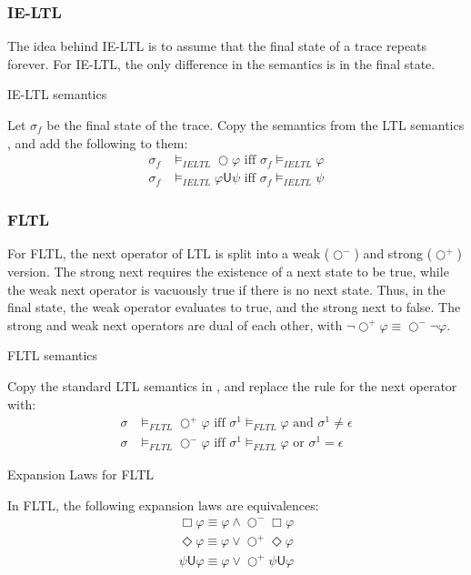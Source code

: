 \documentclass[a4paper]{article}
\newcommand{\U}{\mathsf{U}}
\newcommand{\tand}{\text{ and }}
\newcommand{\tor}{\text{ or }}
\newcommand{\tiff}{\text{ iff }}
\newcommand{\sn}{\bigcirc^+}
\newcommand{\wn}{\bigcirc^-}
\begin{document}
\subsubsection{IE-LTL} The idea behind IE-LTL is to assume that the final state of a trace repeats forever. For IE-LTL, the only difference in the semantics is in the final state.
\begin{defn}{IE-LTL semantics}

  Let $\sigma_f$ be the final state of the trace. Copy the semantics from the LTL semantics , and add the following to them:
  \begin{align*}
    \sigma_f &\vDash_{IELTL} \bigcirc \varphi \tiff \sigma_f \vDash_{IELTL} \varphi\\
    \sigma_f &\vDash_{IELTL} \varphi \U \psi \tiff \sigma_f \vDash_{IELTL} \psi
  \end{align*}
\end{defn}


\subsubsection{FLTL} For FLTL, the next operator of LTL is split into a weak ($\wn$) and strong ($\sn$) version.
The strong next requires the existence of a next state to be true, while the weak next operator is vacuously true if there is no next state.
Thus, in the final state, the weak operator evaluates to true, and the strong next to false. The strong and weak next operators are dual of each other, with  $\neg\sn\varphi \equiv \wn\neg\varphi$.

\begin{defn}{FLTL semantics}

  Copy the standard LTL semantics in , and replace the rule for the next operator with:
  \begin{align*}
    \sigma&\vDash_{FLTL}\sn\varphi \tiff \sigma^1\vDash_{FLTL}\varphi \tand \sigma^1 \neq \epsilon\\
    \sigma&\vDash_{FLTL}\wn\varphi \tiff \sigma^1\vDash_{FLTL}\varphi \tor \sigma^1 = \epsilon
  \end{align*}
\end{defn}

\begin{lem}{Expansion Laws for FLTL}\label{fltlexp}

  In FLTL, the following expansion laws are equivalences:
  \begin{align}
    \Box \varphi \equiv \varphi \land \wn \Box \varphi \label{felBox}\\
    \Diamond \varphi \equiv \varphi \lor \sn \Diamond \varphi\label{felDiamond}\\
    \psi \U \varphi \equiv \varphi \lor \sn \psi \U \varphi\label{felU}
  \end{align}

\end{lem}
\end{document}

